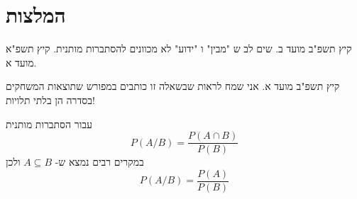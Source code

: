 

\section*{המלצות}



קיץ תשפ"ב מועד ב. שים לב ש "מבין" ו "ידוע" לא מכוונים להסתברות מותנית. קיץ תשפ"א מועד א.

קיץ תשפ"ב מועד א. אני שמח לראות שבשאלה זו כותבים במפורש שתוצאות המשחקים בסדרה הן בלתי תלויות!

עבור הסתברות מותנית
\[
P(A/B)=\frac{P(A\cap B)}{P(B)}
\]
במקרים רבים נמצא ש-%
$A\subseteq B$ 
ולכן
\[
P(A/B)=\frac{P(A)}{P(B)}
\]

